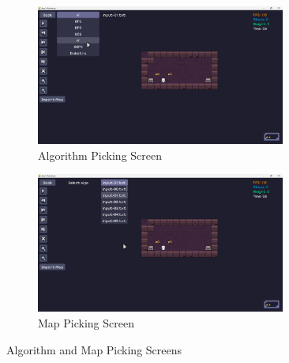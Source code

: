 \begin{figure}[!ht]
	\centering
	\begin{subfigure}{0.46\textwidth}
		\centering
		\includegraphics[width=0.9\textwidth]{imgs/screenshots/pick-algo.png}
		\caption{Algorithm Picking Screen}
	\end{subfigure}
	\hfill
	\begin{subfigure}{0.46\textwidth}
		\centering
		\includegraphics[width=0.9\textwidth]{imgs/screenshots/pick-map.png}
		\caption{Map Picking Screen}
	\end{subfigure}
	\caption{Algorithm and Map Picking Screens}
\end{figure}
